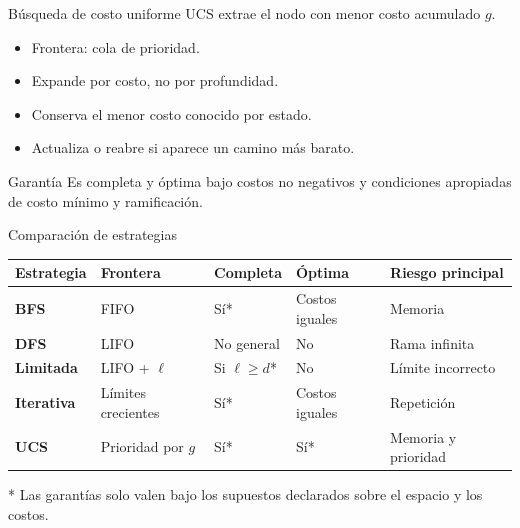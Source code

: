 \documentclass[aspectratio=169,11pt]{beamer}
\begin{document}
\begin{frame}{Búsqueda de costo uniforme}
  UCS extrae el nodo con menor costo acumulado $g$.
  \begin{itemize}
    \item Frontera: cola de prioridad.
    \item Expande por costo, no por profundidad.
    \item Conserva el menor costo conocido por estado.
    \item Actualiza o reabre si aparece un camino más barato.
  \end{itemize}
  \begin{block}{Garantía}
    Es completa y óptima bajo costos no negativos y condiciones apropiadas de costo mínimo y ramificación.
  \end{block}
\end{frame}

\begin{frame}{Comparación de estrategias}
  \scriptsize
  \begin{tabularx}{\textwidth}{>{\bfseries}p{}p{}p{}p{}X}
    \toprule
    Estrategia & Frontera & Completa & Óptima & Riesgo principal \\\midrule
    BFS & FIFO & Sí* & Costos iguales & Memoria \\
    DFS & LIFO & No general & No & Rama infinita \\
    Limitada & LIFO + $\ell$ & Si $\ell\ge d$* & No & Límite incorrecto \\
    Iterativa & Límites crecientes & Sí* & Costos iguales & Repetición \\
    UCS & Prioridad por $g$ & Sí* & Sí* & Memoria y prioridad \\
    \bottomrule
  \end{tabularx}
  \vfill
  \alert{* Las garantías solo valen bajo los supuestos declarados sobre el espacio y los costos.}
\end{frame}
\end{document}
